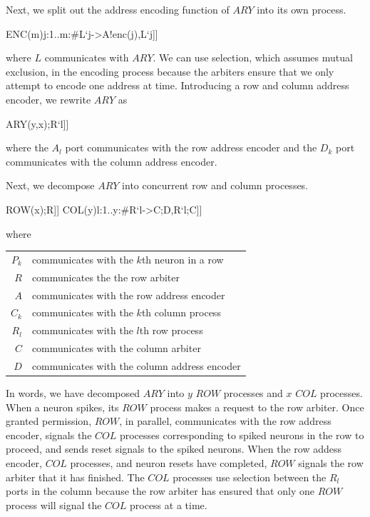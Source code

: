 \documentclass[aer.tex]{subfiles}
\begin{document}
Next, we split out the address encoding function of $ARY$ into its own process.

\begin{csp}
ENC(m)\equiv*[[\langle[]j:1..m:#{L`j}->A!enc(j),L`j\rangle]]
\end{csp}

where $L$ communicates with $ARY$. We can use selection, which assumes mutual exclusion, 
in the encoding process because the arbiters ensure that we only attempt to encode one address at time.
Introducing a row and column address encoder, we rewrite $ARY$ as

\begin{csp}
ARY(y,x)\equiv*[[\langle,l:1..y:\langle|k:1..x:#{P`{l\cdot\,k}}\rangle->R`l;A`l
             ,[\langle,k:1..x:#{P`{l\cdot\,k}}->C`k;D`k,P`{l\cdot\,k};C`k\rangle];R`l\rangle]]
\end{csp}

where the $A_l$ port communicates with the row address encoder
and the $D_k$ port communicates with the column address encoder.

Next, we decompose $ARY$ into concurrent row and column processes.

\begin{csp}
ROW(x)\equiv*[[\langle|k:1..x:#{P`k}\rangle->R;
            A,[\langle,k:1..x:#{P`k}->C`k,P`k\rangle];R]]
COL(y)\equiv*[[\langle[]l:1..y:#{R`l}->C;D,R`l;C\rangle]]
\end{csp}

where

\begin{tabular}[c]{rl}
$P_k$ & communicates with the $k$th neuron in a row \\
$R$ & communicates the the row arbiter \\
$A$ & communicates with the row address encoder \\
$C_k$ & communicates with the $k$th column process \\
$R_l$ & communicates with the $l$th row process \\
$C$ & communicates with the column arbiter \\
$D$ & communicates with the column address encoder \\
\end{tabular}

In words, we have decomposed $ARY$ into $y$ $ROW$ processes and $x$ $COL$ processes. 
When a neuron spikes, its $ROW$ process makes a request to the row arbiter.
Once granted permission, $ROW$, in parallel, communicates with the row address encoder, 
signals the $COL$ processes corresponding to spiked neurons in the row to proceed, 
and sends reset signals to the spiked neurons.
When the row addess encoder, $COL$ processes, and neuron resets have completed, 
$ROW$ signals the row arbiter that it has finished.
The $COL$ processes use selection between the $R_l$ ports in the column because the 
row arbiter has ensured that only one $ROW$ process will signal the $COL$ process
at a time. 
\end{document}
